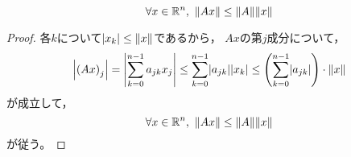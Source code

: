 \documentclass[b5paper,oneside,openany]{ltjsbook} %
\begin{document}
\begin{prop}
    \begin{equation}
        \forall x\in \R^n,\ \norm{Ax}\leq \norm{A}\norm{x}
    \end{equation}
    \begin{proof}
        各$k$について$\abs{x_k}\leq \norm{x}$であるから，
        $Ax$の第$j$成分について，
        \begin{equation}
            \abs{\pare{Ax}_j}=\abs{\sum_{k=0}^{n-1}a_{jk}x_j}
            \leq \sum_{k=0}^{n-1} \abs{a_{jk}}\abs{x_k}
            \leq \pare{\sum_{k=0}^{n-1}\abs{a_{jk}}}\cdot \norm{x}
        \end{equation}
        が成立して，
        \begin{equation}
            \forall x\in \R^n,\ \norm{Ax}\leq \norm{A}\norm{x}
        \end{equation}
        が従う。
    \end{proof}
\end{prop}
\end{document}
